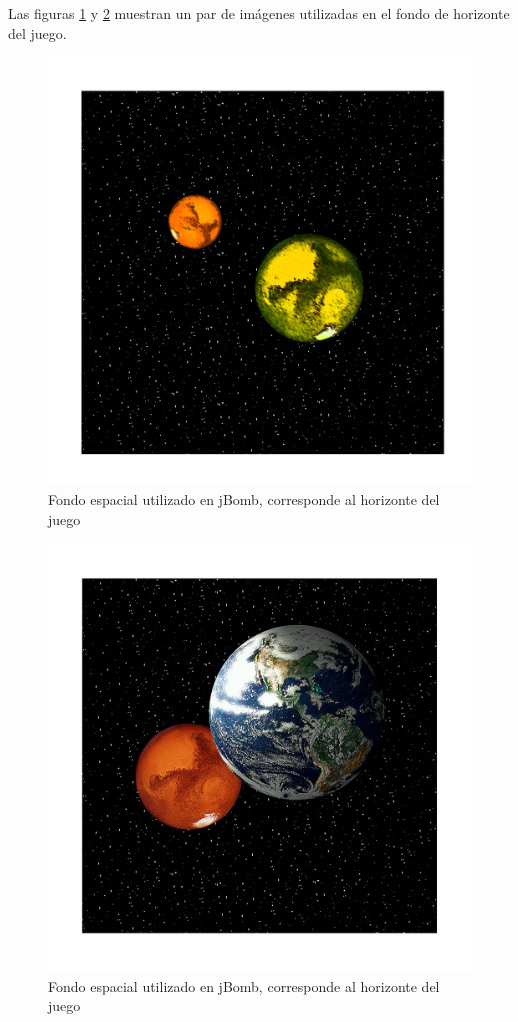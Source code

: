 \documentclass[a4paper,12pt,openany,oneside]{book}
\begin{document}
Las figuras \ref{sky1label} y \ref{sky2label} muestran un par de imágenes utilizadas en el fondo de horizonte del juego.
\begin{figure}
\begin{center}
\includegraphics[scale=.7]{sky.pdf}
\end{center}
\caption[Fondo espacial utilizado en jBomb (1)]{Fondo espacial utilizado en jBomb, corresponde al horizonte del juego \cite{GB}}
\label{sky1label}
\end{figure}
\begin{figure}
\begin{center}
\includegraphics[scale=.7]{sky2.pdf}
\end{center}
\caption[Fondo espacial utilizado en jBomb (2)]{Fondo espacial utilizado en jBomb, corresponde al horizonte del juego \cite{GB}} 
\label{sky2label}
\end{figure}
\end{document}

